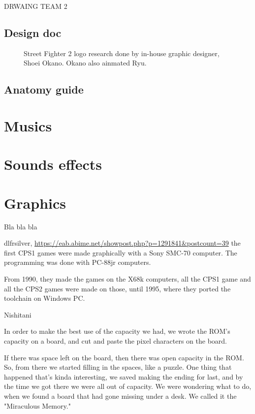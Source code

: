 DRWAING TEAM 2



\subsection{Design doc}

\begin{figure}[H]
\caption*{Street Fighter 2 logo research done by in-house graphic designer, Shoei Okano. Okano also ainmated Ryu.}
\end{figure}











\subsection{Anatomy guide}
\section{Musics}
\section{Sounds effects}




\section{Graphics}
Bla bla bla

\begin{q}{dlfrsilver, \url{https://eab.abime.net/showpost.php?p=1291841&postcount=39}}
the first CPS1 games were made graphically with a Sony SMC-70 computer.
The programming was done with PC-88jr computers.

From 1990, they made the games on the X68k computers, all the CPS1 game and all the CPS2 games were made on those, until 1995, where they ported the toolchain on Windows PC.
\end{q}






\pagebreak

\begin{q}{Nishitani\cite{ffdevinterview}}
  
In order to make the best use of the capacity we had, we wrote the ROM's capacity on a board, and cut and paste the pixel characters on the board.
 
If there was space left on the board, then there was open capacity in the ROM. So, from there we started filling in the spaces, like a puzzle. One thing that happened that's kinda interesting, we saved making the ending for last, and by the time we got there we were all out of capacity. We were wondering what to do, when we found a board that had gone missing under a desk. We called it the "Miraculous Memory."


\end{q}

